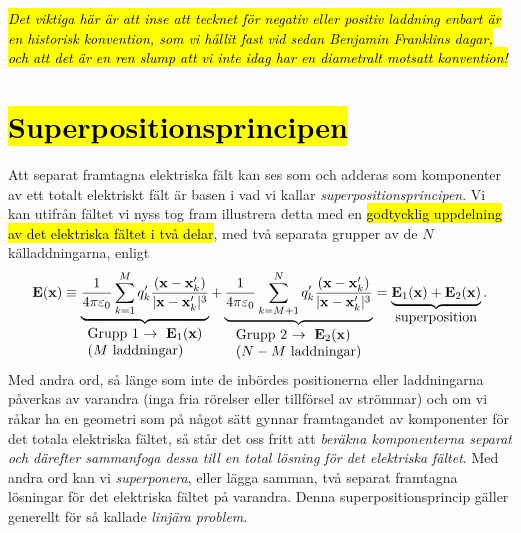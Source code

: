{\hl{\it Det viktiga h{\"a}r {\"a}r att inse att tecknet f{\"o}r negativ
eller positiv laddning enbart {\"a}r en historisk konvention, som vi
h{\aa}llit fast vid sedan Benjamin Franklins dagar, och att det {\"a}r en
ren slump att vi inte idag har en diametralt motsatt konvention!}}
\vfill\eject

\section{\hl{Superpositionsprincipen}}
Att separat framtagna elektriska f{\"a}lt kan ses som och adderas som
komponenter av ett totalt elektriskt f{\"a}lt {\"a}r basen i vad vi kallar
{\it superpositionsprincipen}.
Vi kan utifr{\aa}n f{\"a}ltet vi nyss tog fram illustrera detta med en
{\hl{godtycklig uppdelning av det elektriska f{\"a}ltet i tv{\aa} delar}},
med tv{\aa} separata grupper av de $N$ k{\"a}lladdningarna,
 enligt
\hl{$$
  {\bf E}({\bf x})\equiv
  \underbrace{
    {{1}\over{4\pi\varepsilon_0}}\sum^M_{k=1}
    q'_k {{({\bf x}-{\bf x}'_k)}\over{|{\bf x}-{\bf x}'_k|^3}}
  }_{\vbox{\hbox{Grupp 1 $\rightarrow\ {\bf E}_1({\bf x})$}\hbox{($M$ laddningar)}}}
  +\underbrace{
     {{1}\over{4\pi\varepsilon_0}}\sum^{N}_{k=M+1}
     q'_k {{({\bf x}-{\bf x}'_k)}\over{|{\bf x}-{\bf x}'_k|^3}}
   }_{\vbox{\hbox{Grupp 2 $\rightarrow\ {\bf E}_2({\bf x})$}\hbox{($N-M$ laddningar)}}}
   =\underbrace{{\bf E}_1({\bf x})+{\bf E}_2({\bf x})}_{\hbox{superposition}}.
$$}
\noindent
Med andra ord, s{\aa} l{\"a}nge som inte de inb{\"o}rdes positionerna eller
laddningarna p{\aa}verkas av varandra (inga fria r{\"o}relser eller
tillf{\"o}rsel av str{\"o}mmar) och om vi r{\aa}kar ha en geometri som
p{\aa} n{\aa}got s{\"a}tt gynnar framtagandet av komponenter f{\"o}r det
totala elektriska f{\"a}ltet, s{\aa} st{\aa}r det oss fritt att {\it ber{\"a}kna
komponenterna separat och d{\"a}refter sammanfoga dessa till en total
l{\"o}sning f{\"o}r det elektriska f{\"a}ltet}.
Med andra ord kan vi {\it superponera}, eller {l{\"a}gga samman}, tv{\aa}
separat framtagna l{\"o}sningar f{\"o}r det elektriska f{\"a}ltet p{\aa}
varandra.
Denna superpositionsprincip g{\"a}ller generellt f{\"o}r s{\aa} kallade
{\it linj{\"a}ra problem}.

